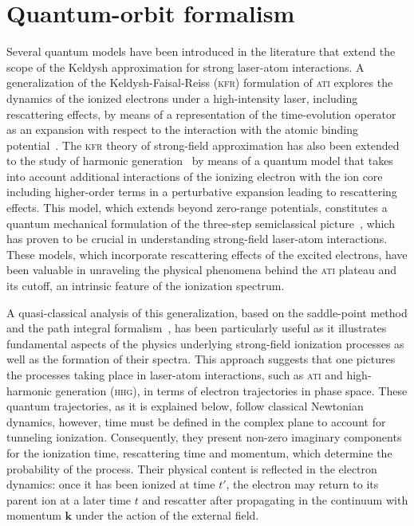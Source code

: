 

\section{\label{sec:q_paths} Quantum-orbit formalism}

Several quantum models have been introduced in the literature that
extend the scope of the Keldysh approximation for strong laser-atom
interactions. A generalization of the Keldysh-Faisal-Reiss
(\textsc{kfr}) formulation of \textsc{ati} explores the dynamics of
the ionized electrons under a high-intensity laser, including
rescattering effects, by means of a representation of the
time-evolution operator as an expansion with respect to the
interaction with the atomic binding
potential~\cite{Kopold_1997sfa}. The \textsc{kfr} theory of
strong-field approximation has also been extended to the study of
harmonic generation~\cite{LewensteinSPA_1994,Lewenstein_1995} by means
of a quantum model that takes into account additional interactions of
the ionizing electron with the ion core including higher-order terms
in a perturbative expansion leading to rescattering effects. This
model, which extends beyond zero-range potentials, constitutes a
quantum mechanical formulation of the three-step semiclassical
picture~\cite{Becker_2step1986}, which has proven to be crucial in
understanding strong-field laser-atom interactions. These models,
which incorporate rescattering effects of the excited electrons, have
been valuable in unraveling the physical phenomena behind the
\textsc{ati} plateau and its cutoff, an intrinsic feature of the
ionization spectrum.

A quasi-classical analysis of this generalization, based on the
saddle-point method and the path integral
formalism~\cite{KopoldOptComm2000,Becker_ellipticalSPA,LewScience2001},
has been particularly useful as it illustrates fundamental aspects of
the physics underlying strong-field ionization processes as well as
the formation of their spectra. This approach suggests that one
pictures the processes taking place in laser-atom interactions, such
as \textsc{ati} and high-harmonic generation (\textsc{hhg}), in terms
of electron trajectories in phase space. These quantum trajectories,
as it is explained below, follow classical Newtonian dynamics,
however, time must be defined in the complex plane to account for
tunneling ionization. Consequently, they present non-zero imaginary
components for the ionization time, rescattering time and momentum,
which determine the probability of the process. Their physical content
is reflected in the electron dynamics: once it has been ionized at
time $t'$, the electron may return to its parent ion at a later time
$t$ and rescatter after propagating in the continuum with momentum
$\mathbf{k}$ under the action of the external field.

